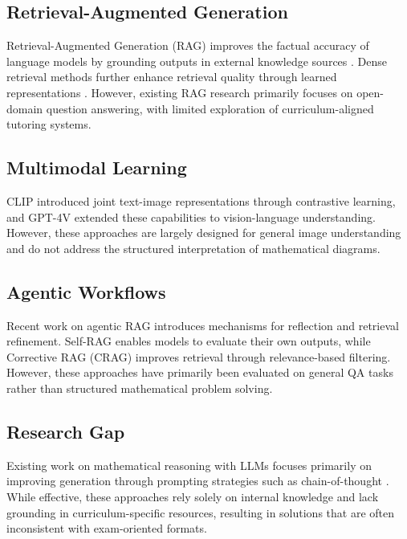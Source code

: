 \documentclass[11pt]{article}
\begin{document}
\subsection{Retrieval-Augmented Generation}

Retrieval-Augmented Generation (RAG) improves the factual accuracy of language models by grounding outputs in external knowledge sources \cite{lewis2020retrieval}. Dense retrieval methods further enhance retrieval quality through learned representations \cite{karpukhin2020dense}. However, existing RAG research primarily focuses on open-domain question answering, with limited exploration of curriculum-aligned tutoring systems.

\subsection{Multimodal Learning}

CLIP \cite{radford2021learning} introduced joint text-image representations through contrastive learning, and GPT-4V \cite{openai2023gpt4} extended these capabilities to vision-language understanding. However, these approaches are largely designed for general image understanding and do not address the structured interpretation of mathematical diagrams.

\subsection{Agentic Workflows}

Recent work on agentic RAG introduces mechanisms for reflection and retrieval refinement. Self-RAG \cite{asai2023self} enables models to evaluate their own outputs, while Corrective RAG (CRAG) \cite{yan2024corrective} improves retrieval through relevance-based filtering. However, these approaches have primarily been evaluated on general QA tasks rather than structured mathematical problem solving.

\subsection{Research Gap}\vspace{-1mm}

Existing work on mathematical reasoning with LLMs focuses primarily on improving generation through prompting strategies such as chain-of-thought \cite{cobbe2021training, wei2022chain}. While effective, these approaches rely solely on internal knowledge and lack grounding in curriculum-specific resources, resulting in solutions that are often inconsistent with exam-oriented formats.
\end{document}
